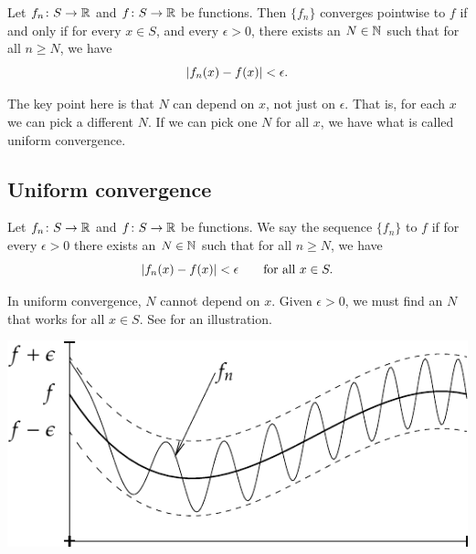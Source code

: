 \begin{prop} \label{ptwsconv:prop}
Let $f_n \colon S \to {\mathbb{R}}$ and $f \colon S \to {\mathbb{R}}$ be functions.
Then $\{ f_n \}$ converges pointwise to $f$ if and only if
for every $x \in S$, and every $\epsilon > 0$, there exists
an $N \in {\mathbb{N}}$ such that for all
$n \geq N$, we have
\begin{equation*}
\left\lvert {f_n(x)-f(x)} \right\rvert < \epsilon .
\end{equation*}
\end{prop}

The key point here is that $N$ can depend on $x$, not just on
$\epsilon$.  That is, for each $x$ we can pick a different $N$.
If we can pick one $N$ for all $x$, we have what is called
uniform convergence.

\subsection{Uniform convergence}

\begin{defn}
Let $f_n \colon S \to {\mathbb{R}}$
and $f \colon S \to {\mathbb{R}}$
be functions.  We say the sequence $\{ f_n \}$
\emph{} to $f$ if for
every $\epsilon > 0$ there exists an $N \in {\mathbb{N}}$ such that 
for all $n \geq N$, we have
\begin{equation*}
\left\lvert {f_n(x) - f(x)} \right\rvert < \epsilon \qquad \text{for all } x \in S.
\end{equation*}
\end{defn}

In uniform convergence, $N$ cannot depend on $x$.  Given $\epsilon > 0$,
we must find an $N$ that works for all $x \in S$.  See
 for an illustration.
\begin{myfigureht}
\includegraphics{figures/uniformconv}
\caption{In uniform convergence,
for $n \geq N$,
the functions $f_n$ are within a strip of $\pm\epsilon$ from $f$.%
\label{fig:uniformconv}}
\end{myfigureht}

